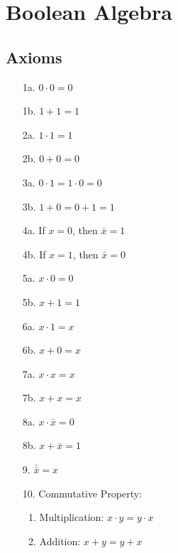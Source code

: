 \documentclass[12pt,openany, tikz,border=10pt]{book}
\begin{document}
			      	\newpage
			      	
			      	
			      	\section{Boolean Algebra}
			      	      
			      	\subsection{Axioms}
			      	\begin{multicols}{2} %
			      		\begin{enumerate}
			      			\item[1a.] $0 \cdot 0 = 0$
			      			\item[1b.] $1 + 1 = 1$
			      			\item[2a.] $1 \cdot 1 = 1$
			      			\item[2b.] $0 + 0 = 0$
			      			\item[3a.] $0 \cdot 1 = 1 \cdot 0 = 0$
			      			\item[3b.] $1 + 0 = 0 + 1 = 1$
			      			\item[4a.] If $x = 0$, then $\bar{x} = 1$
			      			\item[4b.] If $x = 1$, then $\bar{x} = 0$
			      			\item[5a.] $x \cdot 0 = 0$
			      			\item[5b.] $x + 1 = 1$
			      			\item[6a.] $x \cdot 1 = x$
			      			\item[6b.] $x + 0 = x$
			      			\item[7a.] $x \cdot x = x$
			      			\item[7b.] $x + x = x$
			      			\item[8a.] $x \cdot \bar{x} = 0$
			      			\item[8b.] $x + \bar{x} = 1$
			      			\item[9.] $\bar{\bar{x}} = x$
			      			\item[10.] Commutative Property:
			      			      \begin{enumerate}
			      			      	\item Multiplication: \( x \cdot y = y \cdot x \)
			      			      	\item Addition: \( x + y = y + x \)
			      			      \end{enumerate}
                            \vspace*{60px} 

\end{enumerate}
\end{multicols}
\end{document}
